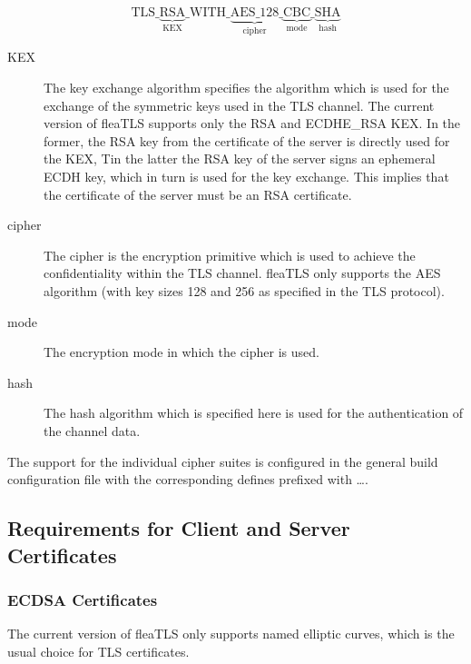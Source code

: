 \documentclass[a4paper,11pt]{scrartcl}
\begin{document}
$$
\mathrm{TLS\_}\underbrace{\mathrm{RSA}}_{\mathrm{KEX}}\mathrm{\_WITH\_}\underbrace{\mathrm{AES\_128}}_{\mathrm{cipher}}\_\underbrace{\mathrm{CBC}}_{\mathrm{mode}
}\_\underbrace{\mathrm{SHA}}_{\mathrm{hash} }
$$
\begin{description}
  \item[KEX] The key exchange algorithm specifies the algorithm which is used
    for the exchange of the symmetric keys used in the TLS channel. The current
    version of fleaTLS supports only the RSA and ECDHE\_RSA KEX. In the former,
    the RSA key from the certificate of the server is directly used for the KEX,
    Tin the latter the RSA key of the server signs an ephemeral ECDH key, which
    in turn is used for the key exchange. This implies that the
    certificate of the server must be an RSA certificate.
  \item[cipher] The cipher is the encryption primitive which is used to achieve
    the confidentiality within the TLS channel. fleaTLS only supports the AES
    algorithm (with key sizes 128 and 256 as specified in the TLS protocol).
  \item [mode] The encryption mode in which the cipher is used. 
  \item[hash] The hash algorithm which is specified here is used for the
    authentication of the channel data.
  \end{description}
The support for the individual cipher suites is configured in the general build
configuration file with the corresponding defines prefixed with \ldots .

\subsection{Requirements for Client and Server Certificates}

\subsubsection{ECDSA Certificates}

The current version of fleaTLS only supports named elliptic curves, which is the
usual choice for TLS certificates. 

\end{document}
